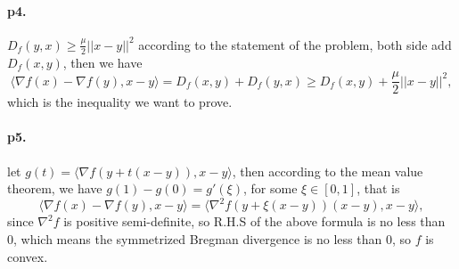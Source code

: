 \documentclass[12pt,a4paper]{article}
\begin{document}
	\paragraph{p4.}$D_f(y,x)\geq \frac{\mu}{2} ||x-y||^2$ according to the statement of the problem, both side add $D_f(x,y)$,
	then we have $$\langle\nabla f(x)-\nabla f(y),x-y\rangle = D_f(x,y)+D_f(y,x)\geq D_f(x,y)+\frac{\mu}{2}||x-y||^2,$$
	which is the inequality we want to prove.
	
	\paragraph{p5.} let $g(t) = \langle \nabla f(y+t(x-y)),x-y\rangle$, then according to the mean value theorem, we have $g(1) - g(0) = g'(\xi)$, for some $\xi\in[0,1]$, that is 
	$$\langle\nabla f(x)-\nabla f(y),x-y\rangle=\langle\nabla^2 f(y+\xi (x-y))(x-y),x-y\rangle,$$
	since $\nabla^2f$ is positive semi-definite, so R.H.S of the above
	 formula is no less than 0, which means the symmetrized Bregman divergence is no less than 0, so $f$ is convex.
\end{document}
